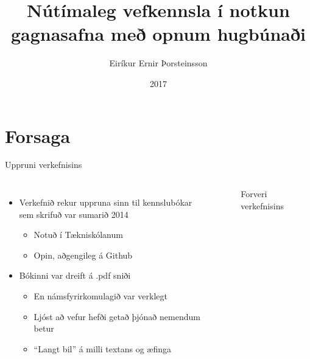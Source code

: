 \documentclass{beamer}
\title{Nútímaleg vefkennsla í notkun gagnasafna með opnum hugbúnaði}
\author{Eiríkur Ernir Þorsteinsson}
\institute{Háskóli Íslands}
\date{2017}
\begin{document}
{
    \frame{\titlepage}
}

\section{Forsaga}

\begin{frame}{Uppruni verkefnisins}
    \begin{columns}
        \begin{itemize}
            \item Verkefnið rekur uppruna sinn til kennslubókar sem skrifuð var sumarið 2014
            \begin{itemize}
                \item Notuð í Tækniskólanum
                \item Opin, aðgengileg á Github
            \end{itemize}
            \item Bókinni var dreift á .pdf sniði
            \begin{itemize}
                \item En námsfyrirkomulagið var verklegt
                \item Ljóst að vefur hefði getað þjónað nemendum betur
                \item ``Langt bil'' á milli textans og æfinga
            \end{itemize}
        \end{itemize}
        \begin{figure}
            \caption{Forveri verkefnisins}

\end{figure}
\end{columns}
\end{frame}
\end{document}
